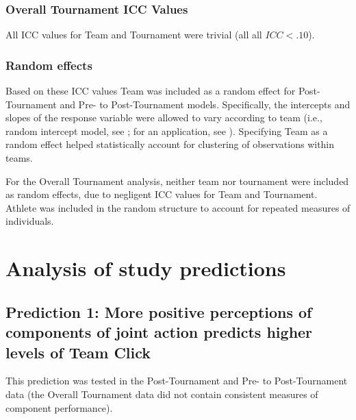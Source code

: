 \begin{CJK}{UTF8}{gbsn}
\subsubsection{Overall Tournament ICC Values}
All ICC values for Team and Tournament were trivial (all all $ICC < .10$).

\subsubsection{Random effects}
Based on these ICC values Team was included as a random effect for Post-Tournament and Pre- to Post-Tournament models.
Specifically, the intercepts and slopes of the response variable were allowed to vary according to team (i.e., random intercept model, see \textcite{Pinheiro2000}; for an application, see \textcite{Oberauer2006}).
Specifying Team as a random effect helped statistically account for clustering of observations within teams.

For the Overall Tournament analysis, neither team nor tournament were included as random effects, due to negligent ICC values for Team and Tournament.  Athlete was included in the random structure to account for repeated measures of individuals.















\clearpage




\section{Analysis of study predictions}




\subsection{Prediction 1: More positive perceptions of components of joint action predicts higher levels of Team Click\label{sect:prediction1a}}

This prediction was tested in the Post-Tournament and Pre- to Post-Tournament data (the Overall Tournament data did not contain consistent measures of component performance).


\end{CJK}
